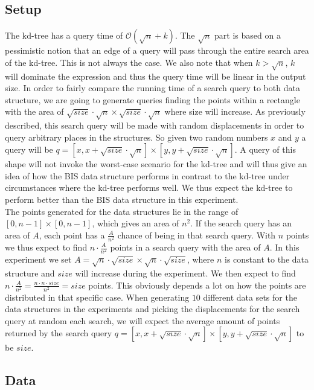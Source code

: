 \subsection{Setup}
The kd-tree has a query time of $\mathcal{O}(\sqrt{n}+k)$. The $\sqrt{n}$ part is based on a pessimistic notion that an edge of a query will pass through the entire search area of the kd-tree. This is not always the case. We also note that when $k > \sqrt{n}$, $k$ will dominate the expression and thus the query time will be linear in the output size. In order to fairly compare the running time of a search query to both data structure, we are going to generate queries finding the points within a rectangle with the area of $\sqrt{size}\cdot\sqrt{n} \times \sqrt{size}\cdot\sqrt{n}$ where size will increase. As previously described, this search query will be made with random displacements in order to query arbitrary places in the structures. So given two random numbers $x$ and $y$ a query will be $q = [x, x+\sqrt{size}\cdot\sqrt{n}] \times [y, y+\sqrt{size}\cdot\sqrt{n}]$. A query of this shape will not invoke the worst-case scenario for the kd-tree and will thus give an idea of how the BIS data structure performs in contrast to the kd-tree under circumstances where the kd-tree performs well. We thus expect the kd-tree to perform better than the BIS data structure in this experiment. \\

The points generated for the data structures lie in the range of $[0,n-1] \times [0,n-1]$, which gives an area of $n^2$. If the search query has an area of $A$, each point has a $\frac{A}{n^2}$ chance of being in that search query. With $n$ points we thus expect to find $n\cdot \frac{A}{n^2}$ points in a search query with the area of $A$. In this experiment we set $A = \sqrt{n}\cdot\sqrt{size}\times\sqrt{n}\cdot\sqrt{size}$, where $n$ is constant to the data structure and $size$ will increase during the experiment. We then expect to find $n\cdot\frac{A}{n^2} = \frac{n\cdot n \cdot size}{n^2} = size$ points. This obviously depends a lot on how the points are distributed in that specific case. When generating $10$ different data sets for the data structures in the experiments and picking the displacements for the search query at random each search, we will expect the average amount of points returned by the search query $q = [x, x+\sqrt{size}\cdot\sqrt{n}] \times [y, y+\sqrt{size}\cdot\sqrt{n}]$ to be $size$.

\subsection{Data}

